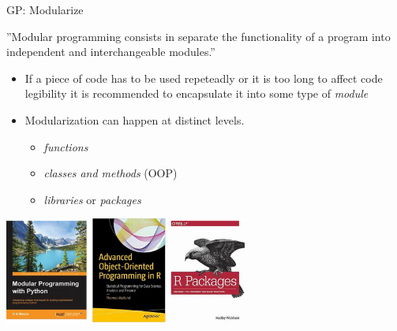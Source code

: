 \documentclass[ignorenonframetext,]{beamer}
\providecommand{\tightlist}{%
  \setlength{\itemsep}{0pt}\setlength{\parskip}{0pt}}
\begin{document}
\begin{frame}{%
\protect\hypertarget{gp-modularize}{%
GP: Modularize}}

”Modular programming consists in separate the functionality of a program
into independent and interchangeable modules.”

\begin{itemize}
\tightlist
\item
  If a piece of code has to be used repeteadly or it is too long to
  affect code legibility it is recommended to encapsulate it into some
  type of \emph{module}
\item
  Modularization can happen at distinct levels.

  \begin{itemize}
  \tightlist
  \item
    \emph{functions}
  \item
    \emph{classes and methods} (OOP)
  \item
    \emph{libraries} or \emph{packages}
  \end{itemize}
\end{itemize}

\begin{center}
\includegraphics[width=0.6\textwidth]{"images/modularProgramming"}
\end{center}

\end{frame}
\end{document}
